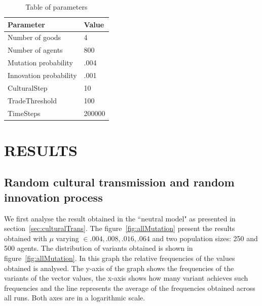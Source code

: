 \documentclass{wscpaperproc}
\begin{document}

\begin{table}
\begin{center}
\begin{tabular}{@{}ll@{}}
\toprule
Parameter & Value \\
\midrule
Number of goods & 4 \\
Number of agents & 800 \\
Mutation probability & .004 \\
Innovation probability & .001\\
CulturalStep &  10 \\
TradeThreshold & 100  \\
TimeSteps & 200000 \\
\bottomrule
\end{tabular}
\caption{Table of parameters}\label{tab:parameters}
\end{center}
\end{table}






\section{RESULTS}
\subsection{Random cultural transmission and random innovation process}

We first analyse the result obtained in the ``neutral model" as presented in section~\ref{sec:culturalTrans}.  The figure~\ref{fig:allMutation} present the results obtained with $\mu$ varying $\in {.004,.008,.016,.064}$ and two population sizes: 250 and 500 agents. The distribution of variants obtained is shown in figure~\ref{fig:allMutation}. In this graph the relative frequencies of the values obtained is analysed. The y-axis of the graph shows the frequencies of the variants of the vector values, the x-axis shows how many variant achieves such frequencies and the line represents the average of the frequencies obtained across all runs. Both axes are in a logarithmic scale.
\end{document}
